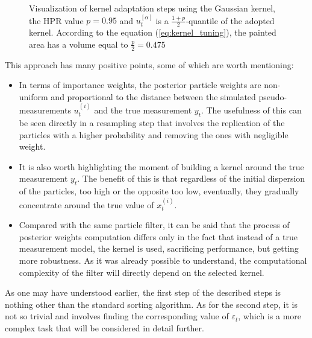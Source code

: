 \begin{figure}[!ht]
\centering
\caption{Visualization of kernel adaptation steps using the Gaussian kernel, the HPR value \(p = 0.95\) and \(u_t^{[\alpha]}\) is a \(\frac{1+p}{2}\)-quantile of the adopted kernel. According to the equation (\ref{eq:kernel_tuning}), the painted area has a volume equal to \(\frac{p}{2} = 0.475\)}
\label{fig:kernel_tuning_example}
\end{figure}

This approach has many positive points, some of which are worth mentioning:

\begin{itemize}
    \item In terms of importance weights, the posterior particle weights are non-uniform and proportional to the distance between the simulated pseudo-measurements \(u_t^{(i)}\) and the true measurement \(y_t\). The usefulness of this can be seen directly in a resampling step that involves the replication of the particles with a higher probability and removing the ones with negligible weight.
    \item It is also worth highlighting the moment of building a kernel around the true measurement \(y_t\). The benefit of this is that regardless of the initial dispersion of the particles, too high or the opposite too low, eventually, they gradually concentrate around the true value of \(x_t^{(i)}\).
    \item Compared with the same particle filter, it can be said that the process of posterior weights computation differs only in the fact that instead of a true measurement model, the kernel is used, sacrificing performance, but getting more robustness. As it was already possible to understand, the computational complexity of the filter will directly depend on the selected kernel.
\end{itemize}

As one may have understood earlier, the first step of the described steps is nothing other than the standard sorting algorithm. As for the second step, it is not so trivial and involves finding the corresponding value of \(\varepsilon_t\), which is a more complex task that will be considered in detail further.

